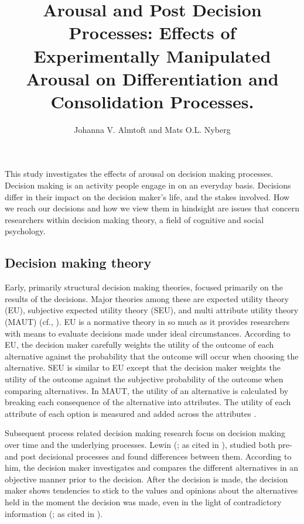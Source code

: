\documentclass[jou,11pt]{apa6}
\title{Arousal and Post Decision Processes: Effects of Experimentally
  Manipulated Arousal on Differentiation and Consolidation Processes.}
\author{Johanna V. Almtoft and Mats O.L. Nyberg}
\affiliation{University of Lund}
\begin{document}
\maketitle


This study investigates the effects of arousal on decision making
processes.  Decision making is an activity people engage in on an
everyday basis.  Decisions differ in  their impact on the decision
maker's life, and the stakes involved.  How we reach our decisions and
how we view them in hindsight are issues that concern researchers
within decision making theory, a field of cognitive and social
psychology.


\subsection{Decision making theory}

Early, primarily structural decision making theories, focused
primarily on the results of the decisions.  Major theories among these
are expected utility theory (EU),  subjective expected utility theory
(SEU), and multi attribute utility theory (MAUT) (cf., \cite{baron94}).
EU is a normative theory in so much as it provides researchers with
means to evaluate decisions made under ideal circumstances.  According
to EU, the decision maker carefully weights the utility of the outcome
of each alternative against the probability that the outcome will
occur when choosing the alternative.  SEU is similar to EU except that
the decision maker weights the utility of the outcome against the
subjective probability of the outcome when comparing alternatives.  In
MAUT, the utility of an alternative is calculated by breaking each
consequence of the alternative into attributes.  The utility of each
attribute of each option is measured and added across the attributes
\parencite{baron94}.

Subsequent process related decision making research focus on decision
making over time and the underlying processes. Lewin (\cite{lewin51}; as
cited in \cite{festinger64}), studied both pre- and post decisional
processes and found differences between them.  According to him, the
decision maker investigates and compares the different alternatives in
an objective manner prior to the decision.  After the decision is
made, the decision maker shows tendencies to stick to the values and
opinions about the alternatives held in the moment the decision was
made, even in the light of contradictory information (\cite{lewin51}; as
cited in \cite{festinger64}).
\end{document}
